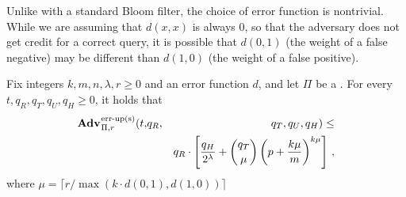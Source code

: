 Unlike with a standard Bloom filter, the choice of error function is nontrivial. While we are assuming that $d(x,x)$ is always 0, so that the adversary does not get credit for a correct query, it is possible that $d(0,1)$ (the weight of a false negative) may be different than $d(1,0)$ (the weight of a false positive).

\begin{theorem}\label{thm:count-bf-bound}
Fix integers $k, m, n, \lambda, r\geq 0$ and an error function $d$, and let $\Pi$ be a .
  For every $t, q_R, q_T, q_U, q_H \geq 0$, it holds that
  \begin{eqnarray*}
    \Adv{\erreps}_{\struct,r}(t,&q_R,& q_T, q_U, q_H) \leq \\ && q_R \cdot \left[\frac{q_H}{2^\lambda} + \binom{q_T}{\mu}\left(p+\frac{k\mu}{m}\right)^{k\mu}\right] \,,
\end{eqnarray*}
where $\mu = \lceil r/\max(k \cdot d(0,1), d(1,0)) \rceil$
\end{theorem}


